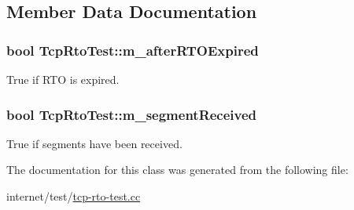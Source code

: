 \subsection{Member Data Documentation}
\subsubsection[{\texorpdfstring{m\+\_\+after\+R\+T\+O\+Expired}{m_afterRTOExpired}}]{\setlength{\rightskip}{0pt plus 5cm}bool Tcp\+Rto\+Test\+::m\+\_\+after\+R\+T\+O\+Expired\hspace{0.3cm}{\ttfamily [private]}}\hypertarget{classTcpRtoTest_a776fcdaa63e6e9d277ed0544ccd9e56d}{}\label{classTcpRtoTest_a776fcdaa63e6e9d277ed0544ccd9e56d}


True if R\+TO is expired. 

\subsubsection[{\texorpdfstring{m\+\_\+segment\+Received}{m_segmentReceived}}]{\setlength{\rightskip}{0pt plus 5cm}bool Tcp\+Rto\+Test\+::m\+\_\+segment\+Received\hspace{0.3cm}{\ttfamily [private]}}\hypertarget{classTcpRtoTest_a39388469b1d3059f808e554e309cf40d}{}\label{classTcpRtoTest_a39388469b1d3059f808e554e309cf40d}


True if segments have been received. 



The documentation for this class was generated from the following file\+:\begin{DoxyCompactItemize}
\item 
internet/test/\hyperlink{tcp-rto-test_8cc}{tcp-\/rto-\/test.\+cc}\end{DoxyCompactItemize}
